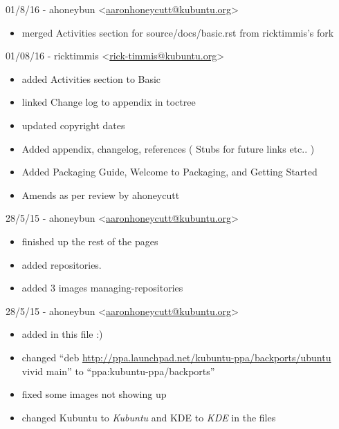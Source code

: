 \documentclass[letterpaper,10pt,english]{sphinxmanual}
\begin{document}
01/8/16 - ahoneybun \textless{}\href{mailto:aaronhoneycutt@kubuntu.org}{aaronhoneycutt@kubuntu.org}\textgreater{}
\begin{itemize}
\item {} 
merged Activities section for source/docs/basic.rst from ricktimmis's fork

\end{itemize}

01/08/16 - ricktimmis \textless{}\href{mailto:rick-timmis@kubuntu.org}{rick-timmis@kubuntu.org}\textgreater{}
\begin{itemize}
\item {} 
added Activities section to Basic

\item {} 
linked Change log to appendix in toctree

\item {} 
updated copyright dates

\item {} 
Added appendix, changelog, references ( Stubs for future links etc.. )

\item {} 
Added Packaging Guide, Welcome to Packaging, and Getting Started

\item {} 
Amends as per review by ahoneycutt

\end{itemize}

28/5/15 - ahoneybun \textless{}\href{mailto:aaronhoneycutt@kubuntu.org}{aaronhoneycutt@kubuntu.org}\textgreater{}
\begin{itemize}
\item {} 
finished up the rest of the pages

\item {} 
added repositories.

\item {} 
added 3 images managing-repositories

\end{itemize}

28/5/15 - ahoneybun \textless{}\href{mailto:aaronhoneycutt@kubuntu.org}{aaronhoneycutt@kubuntu.org}\textgreater{}
\begin{itemize}
\item {} 
added in this file :)

\item {} 
changed ``deb \url{http://ppa.launchpad.net/kubuntu-ppa/backports/ubuntu} vivid main'' to ``ppa:kubuntu-ppa/backports''

\item {} 
fixed some images not showing up

\item {} 
changed Kubuntu to \emph{Kubuntu} and KDE to \emph{KDE} in the files

\end{itemize}
\end{document}
